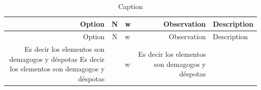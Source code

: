 \documentclass[10pt,]{krantz}
\theoremstyle{definition}
\theoremstyle{definition}
\theoremstyle{definition}
\theoremstyle{definition}
\theoremstyle{remark}
\begin{document}
\begin{longtable}[]{@{}rclrl@{}}
\caption{\label{tab:ww1} Caption}\tabularnewline
\toprule
\begin{minipage}[b]{0.10\columnwidth}\raggedleft
Option\strut
\end{minipage} & \begin{minipage}[b]{0.04\columnwidth}\centering
N\strut
\end{minipage} & \begin{minipage}[b]{0.02\columnwidth}\raggedright
w\strut
\end{minipage} & \begin{minipage}[b]{0.21\columnwidth}\raggedleft
Observation\strut
\end{minipage} & \begin{minipage}[b]{0.49\columnwidth}\raggedright
Description\strut
\end{minipage}\tabularnewline
\midrule
\endfirsthead
\toprule
\begin{minipage}[b]{0.10\columnwidth}\raggedleft
Option\strut
\end{minipage} & \begin{minipage}[b]{0.04\columnwidth}\centering
N\strut
\end{minipage} & \begin{minipage}[b]{0.02\columnwidth}\raggedright
w\strut
\end{minipage} & \begin{minipage}[b]{0.21\columnwidth}\raggedleft
Observation\strut
\end{minipage} & \begin{minipage}[b]{0.49\columnwidth}\raggedright
Description\strut
\end{minipage}\tabularnewline
\midrule
\endhead
\begin{minipage}[t]{0.10\columnwidth}\raggedleft
Es decir los elementos son demagogos y déspotas Es decir los elementos son demagogos y déspotas\strut
\end{minipage} & \begin{minipage}[t]{0.04\columnwidth}\centering
1\strut
\end{minipage} & \begin{minipage}[t]{0.02\columnwidth}\raggedright
w\strut
\end{minipage} & \begin{minipage}[t]{0.21\columnwidth}\raggedleft
Es decir los elementos son demagogos y déspotas\strut
\end{minipage} & \begin{minipage}[t]{0.49\columnwidth}\raggedright

\end{minipage}
\end{longtable}
\end{document}
